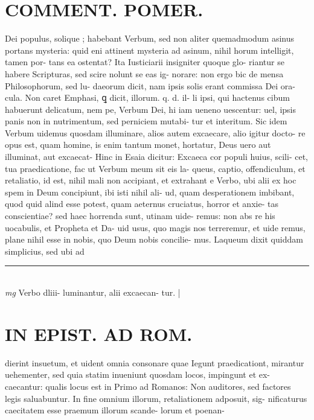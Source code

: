 \documentclass{article}
\begin{document}
\begin{pages}
\section*{COMMENT. POMER.  }\pstart Dei populus, solique ; habebant Verbum, sed non aliter quemadmodum asinus portans mysteria: quid eni attinent mysteria ad asinum, nihil horum intelligit, tamen por- tans ea ostentat? Ita Iusticiarii insigniter quoque glo- riantur se habere Scripturas, sed scire nolunt se eas ig- norare: non ergo bic de mensa Philosophorum, sed lu- daeorum dicit, nam ipsis solis erant commissa Dei ora- cula. Non caret Emphasi, ꝗ dicit, illorum. q. d. il- li ipsi, qui hactenus cibum habuerunt delicatum, nem pe, Verbum Dei, hi iam ueneno uescentur: uel, ipsis panis non in nutrimentum, sed perniciem mutabi- tur et interitum. Sic idem Verbum uidemus quosdam illuminare, alios autem excaecare, alio igitur docto- re opus est, quam homine, is enim tantum monet, hortatur, Deus uero aut illuminat, aut excaecat- Hinc in Esaia dicitur: Excaeca cor populi huius, scili- cet, tua praedicatione, fac ut Verbum meum sit eis la- queus, captio, offendiculum, et retaliatio, id est, nihil mali non accipiant, et extrahant e Verbo, ubi alii ex hoc spem in Deum concipiunt, ibi isti nihil ali- ud, quam desperationem imbibant, quod quid alind esse potest, quam aeternus cruciatus, horror et anxie- tas conscientiae? sed haec horrenda sunt, utinam uide- remus: non abs re his uocabulis, et Propheta et Da- uid usus, quo magis nos terreremur, et uide remus, plane nihil esse in nobis, quo Deum nobis concilie- mus. Laqueum dixit quiddam simplicius, sed ubi ad  \pend
\vspace{0.5cm}\noindent
\vspace{0.2cm}\rule{1cm}{0.2pt}\\ 
\hspace{0.2cm}\textit{mg}
\footnotesize Verbo dliii- luminantur, alii excaecan- tur.  
\normalsize| 
\section*{IN EPIST. AD ROM.  }
\marginpar{[ p.128 ]}\pstart dierint insuetum, et uident omnia consonare quae Iegunt praedicationt, mirantur uehementer, sed quia statim inueniunt quosdam locos, impingunt et ex- caecantur: qualis locus est in Primo ad Romanos: Non auditores, sed factores legis saluabuntur. In fine omnium illorum, retaliationem adposuit, sig- nificaturus caecitatem esse praemum illorum scande- lorum et poenan-  \pend
{}
{}

\end{pages}
\end{document}
